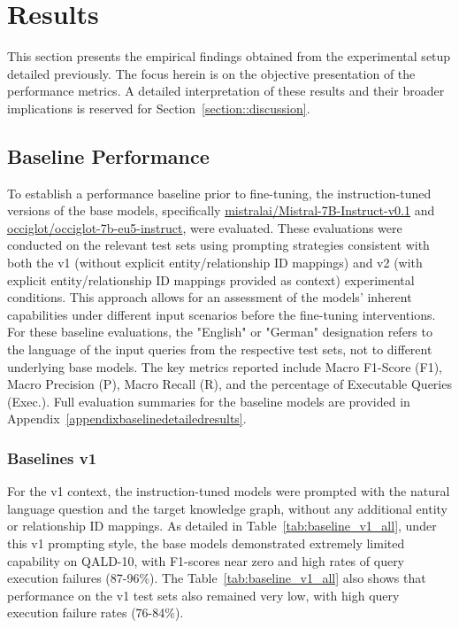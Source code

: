 \section{Results}\label{section::results}

This section presents the empirical findings obtained from the experimental setup detailed previously. 
The focus herein is on the objective presentation of the performance metrics. 
A detailed interpretation of these results and their broader implications is reserved for Section~\ref{section::discussion}.

\subsection{Baseline Performance}\label{sec:baseline_results}
To establish a performance baseline prior to fine-tuning, the instruction-tuned versions of the base models, specifically \url{mistralai/Mistral-7B-Instruct-v0.1} and \url{occiglot/occiglot-7b-eu5-instruct}, were evaluated.
These evaluations were conducted on the relevant test sets using prompting strategies consistent with both the v1 (without explicit entity/relationship ID mappings) and v2 (with explicit entity/relationship ID mappings provided as context) experimental conditions. 
This approach allows for an assessment of the models' inherent capabilities under different input scenarios before the fine-tuning interventions. 
For these baseline evaluations, the "English" or "German" designation refers to the language of the input queries from the respective test sets, not to different underlying base models. 
The key metrics reported include Macro F1-Score (F1), Macro Precision (P), Macro Recall (R), and the percentage of Executable Queries (Exec.). 
Full evaluation summaries for the baseline models are provided in Appendix~\ref{appendixbaselinedetailedresults}.

\subsubsection{Baselines v1}\label{sec:baseline_v1_context}
For the v1 context, the instruction-tuned models were prompted with the natural language
question and the target knowledge graph, without any additional entity or relationship
ID mappings. As detailed in Table~\ref{tab:baseline_v1_all}, under this v1 prompting style, the base models demonstrated extremely limited capability
on QALD-10, with F1-scores near zero and high rates of query execution failures (87-96\%). The Table~\ref{tab:baseline_v1_all} also shows that performance on the v1 test sets also remained very low, with high query execution failure
rates (76-84\%).

